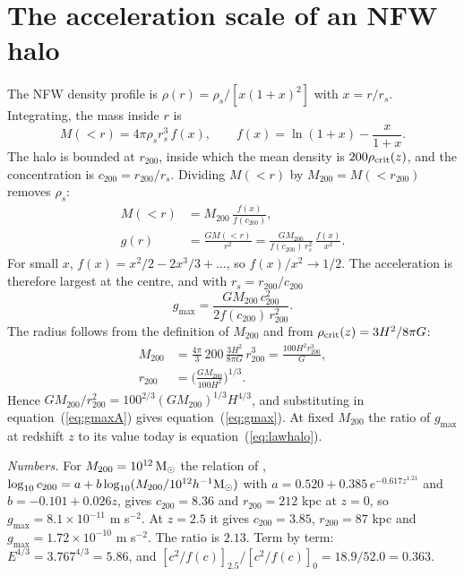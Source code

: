 \documentclass[fleqn,usenatbib]{mnras}
\begin{document}



\appendix
\section{The acceleration scale of an NFW halo}
\label{app:nfw}
The NFW density profile is $\rho(r)=\rho_s/[x(1+x)^2]$ with $x=r/r_s$. Integrating, the mass inside $r$ is
\begin{equation}
M(<r)=4\pi\rho_sr_s^3\,f(x),\qquad f(x)=\ln(1+x)-\frac{x}{1+x} .
\end{equation}
The halo is bounded at $r_{200}$, inside which the mean density is $200\rho_{\rm crit}(z)$, and the concentration is $c_{200}=r_{200}/r_s$. Dividing $M(<r)$ by $M_{200}=M(<r_{200})$ removes $\rho_s$:
\begin{align}
M(<r)&=M_{200}\,\frac{f(x)}{f(c_{200})},\\
g(r)&=\frac{GM(<r)}{r^2}=\frac{GM_{200}}{f(c_{200})\,r_s^2}\,\frac{f(x)}{x^2} .
\end{align}
For small $x$, $f(x)=x^2/2-2x^3/3+\ldots$, so $f(x)/x^2\to1/2$. The acceleration is therefore largest at the centre, and with $r_s=r_{200}/c_{200}$
\begin{equation}
g_{\max}=\frac{GM_{200}\,c_{200}^2}{2f(c_{200})\,r_{200}^2} .
\label{eq:gmaxA}
\end{equation}
The radius follows from the definition of $M_{200}$ and from $\rho_{\rm crit}(z)=3H^2/8\pi G$:
\begin{align}
M_{200}&=\frac{4\pi}{3}\,200\,\frac{3H^2}{8\pi G}\,r_{200}^3=\frac{100H^2r_{200}^3}{G},\\
r_{200}&=\Big(\frac{GM_{200}}{100H^2}\Big)^{1/3} .
\end{align}
Hence $GM_{200}/r_{200}^2=100^{2/3}(GM_{200})^{1/3}H^{4/3}$, and substituting in equation~(\ref{eq:gmaxA}) gives equation~(\ref{eq:gmax}). At fixed $M_{200}$ the ratio of $g_{\max}$ at redshift $z$ to its value today is equation~(\ref{eq:lawhalo}).

\emph{Numbers.} For $M_{200}=10^{12}\,{\rm M_\odot}$ the relation of \citet{DuttonMaccio2014}, $\log_{10}c_{200}=a+b\log_{10}(M_{200}/10^{12}h^{-1}{\rm M_\odot})$ with $a=0.520+0.385\,e^{-0.617z^{1.21}}$ and $b=-0.101+0.026z$, gives $c_{200}=8.36$ and $r_{200}=212$ kpc at $z=0$, so $g_{\max}=8.1\times10^{-11}$ m s$^{-2}$. At $z=2.5$ it gives $c_{200}=3.85$, $r_{200}=87$ kpc and $g_{\max}=1.72\times10^{-10}$ m s$^{-2}$. The ratio is $2.13$. Term by term: $E^{4/3}=3.767^{4/3}=5.86$, and $[c^2/f(c)]_{2.5}/[c^2/f(c)]_0=18.9/52.0=0.363$.
\end{document}
